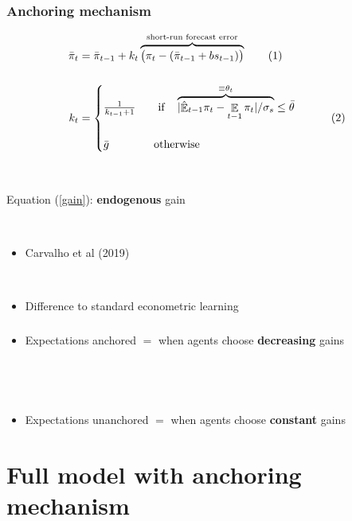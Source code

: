 \documentclass{beamer}
\DeclareMathOperator{\E}{\mathbb{E}}
\newcommand\numberthis{\addtocounter{equation}{1}\tag{\theequation}} %
\begin{document}
\begin{frame}
	\frametitle{Anchoring mechanism}
	
 \begin{align*}
\bar{\pi}_{t} & = \bar{\pi}_{t-1} +k_t\overbrace{\big(\pi_{t} -(\bar{\pi}_{t-1}+bs_{t-1}) \big)}^{\text{short-run forecast error}}  \label{RLS_anchoring} \numberthis \\
\\
k_t &= \begin{cases}  \frac{1}{k_{t-1} +1} \quad \quad \text{if} \quad \overbrace{|\hat{\E}_{t-1}\pi_t - \E_{t-1}\pi_t| / \sigma_s}^{\equiv \theta_t} \leq \bar{\theta} \\ \\\bar{g} \quad \quad \quad \quad \text{otherwise}\end{cases} \label{gain} \numberthis
\end{align*}

\

Equation (\ref{gain}): \textbf{endogenous} gain

\

\begin{itemize}
\item Carvalho et al (2019)

\

\item Difference to standard econometric learning
\end{itemize}


\end{frame}

\begin{frame}
	\frametitle{}
	
	


\begin{itemize}
\item Expectations anchored $ = $ when agents choose \textbf{decreasing} gains

\

\

\item Expectations unanchored $ = $ when agents choose \textbf{constant} gains
\end{itemize}



\end{frame}



\section{Full model with anchoring mechanism}
\end{document}
